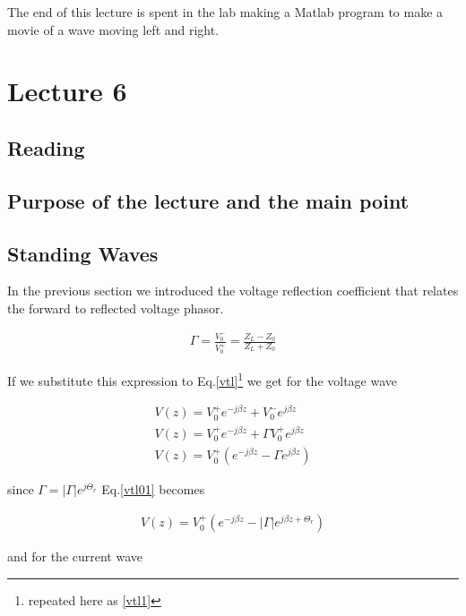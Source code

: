 The end of this lecture is spent in the lab making a Matlab program to
make a movie of a wave moving left and right.

\newpage
\section{Lecture 6}



\subsection{Reading}


\subsection{Purpose of the lecture and the main point}




\subsection{Standing Waves}


In the previous section we introduced the voltage reflection
coefficient that relates the forward to reflected voltage phasor.


\begin{eqnarray}
\Gamma = \frac{V_0^-}{V_0^+} = \frac{Z_L -Z_0}{Z_L +Z_0}
\end{eqnarray}


If we substitute this expression to Eq.\ref{vtl}\footnote{repeated
here as \ref{vtl1}} we get for the voltage wave


\begin{eqnarray}
V(z) = V_0^+ e^{-j \beta z} +V_0^- e^{j \beta z} \label{vtl1}\\
V(z) = V_0^+ e^{-j \beta z} + \Gamma  V_0^+ e^{j \beta z} \nonumber
\\
V(z)= V_0^+ (e^{-j \beta z} - \Gamma  e^{j \beta z}  ) \label{vtl01}
\end{eqnarray}

since $\Gamma = |\Gamma| e^{j \Theta_r}$ Eq.\ref{vtl01} becomes


\begin{eqnarray}
V(z)= V_0^+ (e^{-j \beta z} - |\Gamma|  e^{j \beta z + \Theta_r}  ) \label{vtl01}
\end{eqnarray}



and for the current wave



